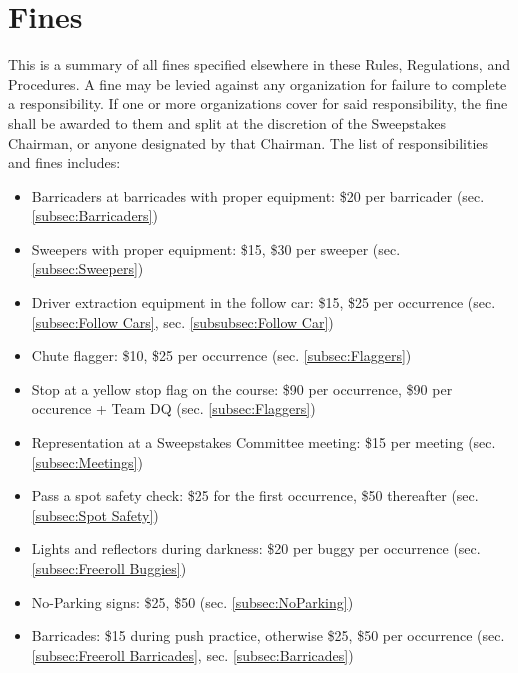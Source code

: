 
	\renewcommand\thesection{\Alph{section}.}
	\section{Fines}
		This is a summary of all fines specified elsewhere in these Rules, Regulations, and Procedures. A fine may be levied against any organization for failure to complete a responsibility. If one or more organizations cover for said responsibility, the fine shall be awarded to them and split at the discretion of the Sweepstakes Chairman, or anyone designated by that Chairman. The list of responsibilities and fines includes:

		\begin{itemize}

			\item Barricaders at barricades with proper equipment: \$20 per barricader (sec. \ref{subsec:Barricaders})
			
			\item Sweepers with proper equipment: \$15, \$30 per sweeper (sec. \ref{subsec:Sweepers})
			
			\item Driver extraction equipment in the follow car: \$15, \$25 per occurrence (sec. \ref{subsec:Follow Cars}, sec. \ref{subsubsec:Follow Car})
			
			\item Chute flagger: \$10, \$25 per occurrence (sec. \ref{subsec:Flaggers})
			
			\item Stop at a yellow stop flag on the course: \$90 per occurrence, \$90 per occurence + Team DQ (sec. \ref{subsec:Flaggers}) %

			\item Representation at a Sweepstakes Committee meeting: \$15 per meeting (sec. \ref{subsec:Meetings})

			\item Pass a spot safety check: \$25 for the first occurrence, \$50 thereafter (sec. \ref{subsec:Spot Safety})
			
			\item Lights and reflectors during darkness: \$20 per buggy per occurrence (sec. \ref{subsec:Freeroll Buggies})

			\item No-Parking signs: \$25, \$50 (sec. \ref{subsec:NoParking})
			
			\item Barricades: \$15 during push practice, otherwise \$25, \$50 per occurrence (sec. \ref{subsec:Freeroll Barricades}, sec. \ref{subsec:Barricades})


\end{itemize}
